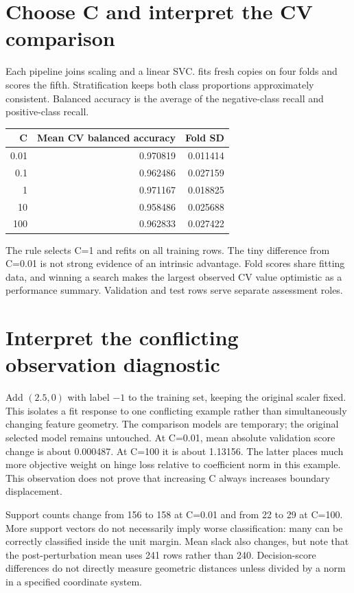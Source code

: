 \section{Choose C and interpret the CV comparison}
Each pipeline joins scaling and a linear SVC.  fits fresh copies on four folds and
scores the fifth. Stratification keeps both class proportions approximately consistent.
Balanced accuracy is the average of the negative-class recall and positive-class recall.
\begin{center}\begin{tabular}{rrr}\toprule
C&Mean CV balanced accuracy&Fold SD\\\midrule
0.01&0.970819&0.011414\\0.1&0.962486&0.027159\\1&0.971167&0.018825\\
10&0.958486&0.025688\\100&0.962833&0.027422\\\bottomrule\end{tabular}\end{center}
The rule selects C=1 and refits on all training rows. The tiny difference from C=0.01 is not strong evidence
of an intrinsic advantage. Fold scores share fitting data, and winning a search makes the largest observed
CV value optimistic as a performance summary. Validation and test rows serve separate assessment roles.

\section{Interpret the conflicting observation diagnostic}
Add $(2.5,0)$ with label $-1$ to the training set, keeping the original scaler fixed.
This isolates a fit response to one conflicting example rather than simultaneously changing feature geometry.
The comparison models are temporary; the original selected model remains untouched.
At C=0.01, mean absolute validation score change is about 0.000487. At C=100 it is about 1.13156.
The latter places much more objective weight on hinge loss relative to coefficient norm in this example.
This observation does not prove that increasing C always increases boundary displacement.

Support counts change from 156 to 158 at C=0.01 and from 22 to 29 at C=100.
More support vectors do not necessarily imply worse classification: many can be correctly classified inside
the unit margin. Mean slack also changes, but note that the post-perturbation mean uses 241 rows rather than 240.
Decision-score differences do not directly measure geometric distances unless divided by a norm in a specified coordinate system.

